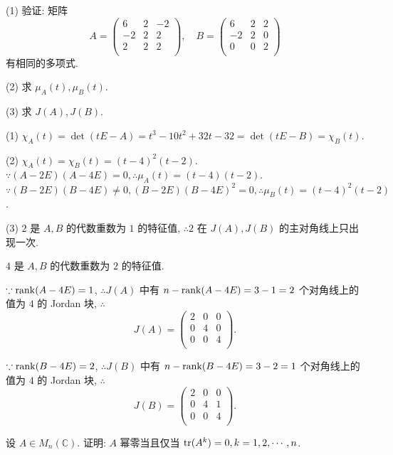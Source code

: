 \documentclass[color=black,device=normal,lang=cn,mode=geye]{elegantnote}
\begin{document}
\begin{exercise}%
    (1) 验证: 矩阵
    \[A=\begin{pmatrix}
        6 & 2 & -2 \\
        -2 & 2 & 2 \\
        2 & 2 & 2 \\
    \end{pmatrix},\quad B=\begin{pmatrix}
        6 & 2 & 2 \\
        -2 & 2 & 0 \\
        0 & 0 & 2 \\
    \end{pmatrix}\]
    有相同的多项式.

    (2) 求 $\mu_A(t),\mu_B(t)$.

    (3) 求 $J(A),J(B)$.
\end{exercise}
\begin{solution}
    (1) $\chi_A(t)=\det(tE-A)=t^3-10t^2+32t-32=\det(tE-B)=\chi_B(t)$.

    (2) $\chi_A(t)=\chi_B(t)=(t-4)^2(t-2)$. $\because(A-2E)(A-4E)=0,\therefore\mu_A(t)=(t-4)(t-2)$. $\because(B-2E)(B-4E)\neq0,(B-2E)(B-4E)^2=0,\therefore\mu_B(t)=(t-4)^2(t-2)$.

    (3) $2$ 是 $A,B$ 的代数重数为 $1$ 的特征值, $\therefore2$ 在 $J(A),J(B)$ 的主对角线上只出现一次.

    $4$ 是 $A,B$ 的代数重数为 $2$ 的特征值.

    $\because\operatorname{rank} (A-4E)=1$, $\therefore J(A)$ 中有 $n-\operatorname{rank} (A-4E)=3-1=2$ 个对角线上的值为 $4$ 的 Jordan 块, $\therefore$
    \[J(A)=\begin{pmatrix}
        2 & 0 & 0 \\
        0 & 4 & 0 \\
        0 & 0 & 4 \\
    \end{pmatrix}.\]

    $\because\operatorname{rank} (B-4E)=2$, $\therefore J(B)$ 中有 $n-\operatorname{rank} (B-4E)=3-2=1$ 个对角线上的值为 $4$ 的 Jordan 块, $\therefore$
    \[J(B)=\begin{pmatrix}
        2 & 0 & 0 \\
        0 & 4 & 1 \\
        0 & 0 & 4 \\
    \end{pmatrix}.\]
\end{solution}
\begin{exercise}[有修改]%
    设 $A\in M_n(\mathbb{C})$. 证明: $A$ 幂零当且仅当 $\operatorname{tr}(A^k)=0,k=1,2,\cdots,n$.
\end{exercise}
\end{document}

